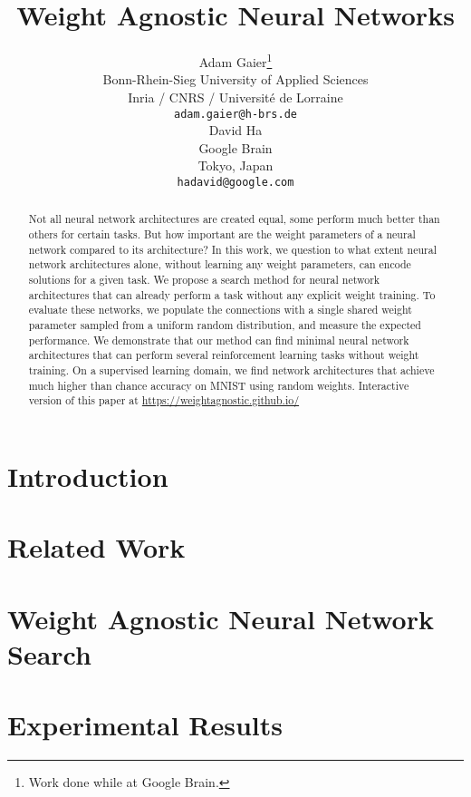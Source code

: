 \documentclass{article}
\title{Weight Agnostic Neural Networks}
\author{
  Adam Gaier\thanks{Work done while at Google Brain.}\\
  Bonn-Rhein-Sieg University of Applied Sciences\\
  Inria / CNRS / Universit\'e de Lorraine \\
  \texttt{adam.gaier@h-brs.de} \\
  \And
  David Ha \\
  Google Brain\\
  Tokyo, Japan \\
  \texttt{hadavid@google.com} \\
}
\def \websiteurl {https://weightagnostic.github.io/}
\begin{document}
\maketitle

\begin{abstract}
Not all neural network architectures are created equal, some perform much better than others for certain tasks. But how important are the weight parameters of a neural network compared to its architecture? In this work, we question to what extent neural network architectures alone, without learning any weight parameters, can encode solutions for a given task. We propose a search method for neural network architectures that can already perform a task without any explicit weight training. To evaluate these networks, we populate the connections with a single shared weight parameter sampled from a uniform random distribution, and measure the expected performance. We demonstrate that our method can find minimal neural network architectures that can perform several reinforcement learning tasks without weight training. On a supervised learning domain, we find network architectures that achieve much higher than chance accuracy on MNIST using random weights.
%
Interactive version of this paper at \url{\websiteurl}
\end{abstract}

\section{Introduction} 
\vskip -0.03in %


\vskip -0.05in %
\section{Related Work} 
\vskip -0.05in %


\vskip -0.05in %
\section{Weight Agnostic Neural Network Search} %
\vskip -0.09in %


\vskip -0.05in %
\section{Experimental Results} %
\vskip -0.05in %

\end{document}
